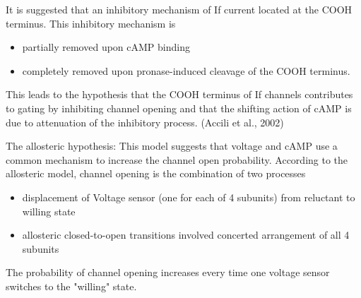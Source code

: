 It is suggested that an inhibitory mechanism of If current located at the COOH
terminus. This inhibitory mechanism is
\begin{itemize}
  \item partially removed upon cAMP binding
  
  \item completely removed upon pronase-induced cleavage of the COOH terminus.
\end{itemize}
This leads to the hypothesis that the
COOH terminus of If channels contributes to gating by inhibiting
channel opening and that the shifting action of cAMP is
due to attenuation of the inhibitory process. \citep{accili2002} (Accili et
al., 2002)

The allosteric hypothesis: This model suggests that voltage and
cAMP use a common mechanism to increase the channel
open probability. According to the allosteric model, channel
opening is the combination of two processes
\begin{itemize}
  \item displacement of Voltage sensor (one for each of 4 subunits) from
  reluctant to willing state
  
  
  \item allosteric closed-to-open transitions involved concerted arrangement of
  all 4 subunits
\end{itemize}
The probability of channel opening increases every time one voltage sensor
switches to the "willing" state.

